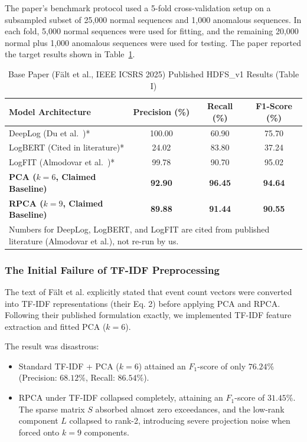 The paper's benchmark protocol used a 5-fold cross-validation setup on a subsampled subset of 25,000 normal sequences and 1,000 anomalous sequences. In each fold, 5,000 normal sequences were used for fitting, and the remaining 20,000 normal plus 1,000 anomalous sequences were used for testing. The paper reported the target results shown in Table~\ref{tab:hdfs_base_paper_targets}.

\begin{table}[htbp]
\centering
\caption{Base Paper (F{\"a}lt et al., IEEE ICSRS 2025) Published HDFS\_v1 Results (Table I)}
\label{tab:hdfs_base_paper_targets}
\begin{tabular}{lccc}
\toprule
\textbf{Model Architecture} & \textbf{Precision (\%)} & \textbf{Recall (\%)} & \textbf{F1-Score (\%)} \\
\midrule
DeepLog (Du et al.~\cite{du2017deeplog})* & 100.00 & 60.90 & 75.70 \\
LogBERT (Cited in literature)* & 24.02 & 83.80 & 37.24 \\
LogFIT (Almodovar et al.~\cite{almodovar2024logfit})* & 99.78 & 90.70 & 95.02 \\
\midrule
\textbf{PCA ($k=6$, Claimed Baseline)} & \textbf{92.90} & \textbf{96.45} & \textbf{94.64} \\
\textbf{RPCA ($k=9$, Claimed Baseline)} & \textbf{89.88} & \textbf{91.44} & \textbf{90.55} \\
\bottomrule
\multicolumn{4}{l}{\footnotesize *Numbers for DeepLog, LogBERT, and LogFIT are cited from published literature (Almodovar et al.), not re-run by us.}
\end{tabular}
\end{table}

\subsubsection{The Initial Failure of TF-IDF Preprocessing}
The text of F{\"a}lt et al. explicitly stated that event count vectors were converted into TF-IDF representations (their Eq. 2) before applying PCA and RPCA. Following their published formulation exactly, we implemented TF-IDF feature extraction and fitted PCA ($k=6$). 

The result was disastrous:
\begin{itemize}
    \item Standard TF-IDF + PCA ($k=6$) attained an $F_1$-score of only $\mathbf{76.24\%}$ (Precision: $68.12\%$, Recall: $86.54\%$).
    \item RPCA under TF-IDF collapsed completely, attaining an $F_1$-score of $\mathbf{31.45\%}$. The sparse matrix $S$ absorbed almost zero exceedances, and the low-rank component $L$ collapsed to rank-2, introducing severe projection noise when forced onto $k=9$ components.
\end{itemize}

